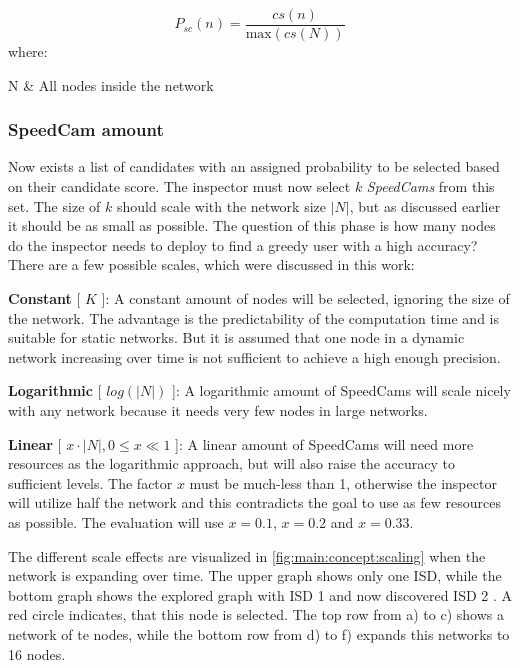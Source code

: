 \documentclass[thesis.tex]{subfiles}
\begin{document}
\begin{equation}
P_{sc}(n) = \frac{cs(n)}{\text{max}(cs(N))}
\end{equation}
where:
\begin{conditions}
    N           &  All nodes inside the network 
\end{conditions}

\subsubsection{SpeedCam amount}

Now exists a list of candidates with an assigned probability to be selected based on their candidate score. The inspector must now select $k$ \textit{SpeedCams} from this set. The size of $k$ should scale with the network size $|N|$, but as discussed earlier it should be as small as possible. The question of this phase is how many nodes do the inspector needs to deploy to find a greedy user with a high accuracy? There are a few possible scales, which were discussed in this work:

\textbf{Constant} [ $K$ ]: A constant amount of nodes will be selected, ignoring the size of the network. The advantage is the predictability of the computation time and is suitable for static networks. But it is assumed that one node in a dynamic network increasing over time is not sufficient to achieve a high enough precision.

\textbf{Logarithmic} [ $log(|N|)$ ]: A logarithmic amount of SpeedCams will scale nicely with any network because it needs very few nodes in large networks. 

\textbf{Linear} [ $x\cdot |N|, 0 \leq x\ll1$ ]: A linear amount of SpeedCams will need more resources as the logarithmic approach, but will also raise the accuracy to sufficient levels. The factor $x$ must be much-less than 1, otherwise the inspector will utilize half the network and this contradicts the goal to use as few resources as possible. The evaluation will use $x=0.1$, $x=0.2$ and $x=0.33$.

The different scale effects are visualized in \autoref{fig:main:concept:scaling} when the network is expanding over time. The upper graph shows only one ISD, while the bottom graph shows the explored graph with ISD 1 and now discovered ISD 2 . A red circle indicates, that this node is selected. The top row from a) to c) shows a network of te nodes, while the bottom row from d) to f) expands this networks to 16 nodes. 
\end{document}

